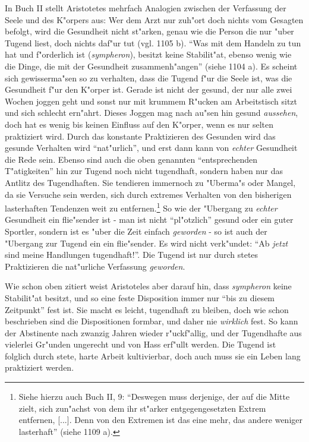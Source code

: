 \documentclass[a4paper, emulatestandardclasses, 12pt]{scrartcl}
\begin{document}
\begin{onehalfspace}
In Buch II stellt Aristotetes mehrfach Analogien zwischen der Verfassung der Seele und des K"orpers aus: Wer dem Arzt nur zuh"ort doch nichts vom Gesagten befolgt, wird die Gesundheit nicht st"arken, genau wie die Person die nur "uber Tugend liest, doch nichts daf"ur tut (vgl. 1105 b). "`Was mit dem Handeln zu tun hat und f"orderlich ist (\emph{sympheron}), besitzt keine Stabilit"at, ebenso wenig wie die Dinge, die mit der Gesundheit zusammenh"angen"' (siehe 1104 a). Es scheint sich gewisserma"sen so zu verhalten, dass die Tugend f"ur die Seele ist, was die Gesundheit f"ur den K"orper ist. Gerade ist nicht der gesund, der nur alle zwei Wochen joggen geht und sonst nur mit krummem R"ucken am Arbeitstisch sitzt und sich schlecht ern"ahrt. Dieses Joggen mag nach au"sen hin gesund \emph{aussehen}, doch hat es wenig bis keinen Einfluss auf den K"orper, wenn es nur selten praktiziert wird. Durch das konstante Praktizieren des Gesunden wird das gesunde Verhalten wird "`nat"urlich"', und erst dann kann von \emph{echter} Gesundheit die Rede sein. Ebenso sind auch die oben genannten "`entsprechenden T"atigkeiten"' hin zur Tugend noch nicht tugendhaft, sondern haben nur das Antlitz des Tugendhaften. Sie tendieren immernoch zu "Uberma"s oder Mangel, da sie Versuche sein werden, sich durch extremes Verhalten von den bisherigen lasterhaften Tendenzen weit zu entfernen.\footnote{Siehe hierzu auch Buch II, 9: "`Deswegen muss derjenige, der auf die Mitte zielt, sich zun"achst von dem ihr st"arker entgegengesetzten Extrem entfernen, [...]. Denn von den Extremen ist das eine mehr, das andere weniger lasterhaft"' (siehe 1109 a).} So wie der "Ubergang zu \emph{echter} Gesundheit ein flie"sender ist - man ist nicht "`pl"otzlich"' gesund oder ein guter Sportler, sondern ist es "uber die Zeit einfach \emph{geworden} - so ist auch der "Ubergang zur Tugend ein ein flie"sender. Es wird nicht verk"undet: "`Ab \emph{jetzt} sind meine Handlungen tugendhaft!"'. Die Tugend ist nur durch stetes Praktizieren die nat"urliche Verfassung \emph{geworden}.

Wie schon oben zitiert weist Aristoteles aber darauf hin, dass \emph{sympheron} keine Stabilit"at besitzt, und so eine feste Disposition immer nur "`bis zu diesem Zeitpunkt"' fest ist. Sie macht es leicht, tugendhaft zu bleiben, doch wie schon beschrieben sind die Dispositionen formbar, und daher nie \emph{wirklich} fest. So kann der Abstinente nach zwanzig Jahren wieder r"uckf"allig, und der Tugendhafte aus vielerlei Gr"unden ungerecht und von Hass erf"ullt werden. Die Tugend ist folglich durch stete, harte Arbeit kultivierbar, doch auch muss sie ein Leben lang praktiziert werden.


\end{onehalfspace}
\end{document}
